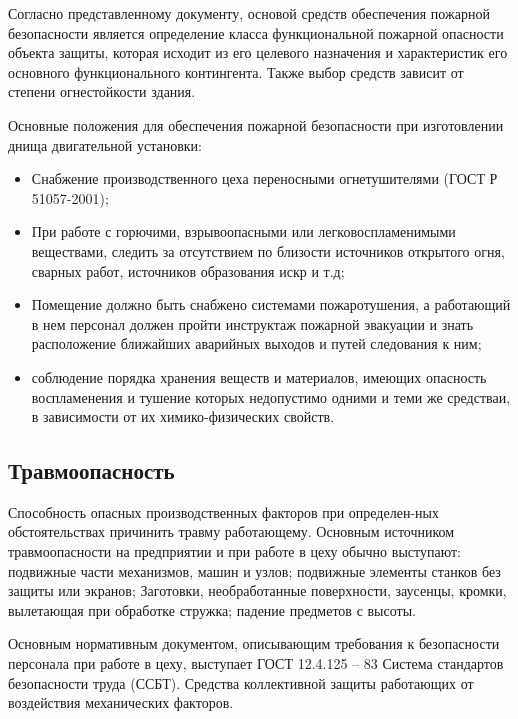 Согласно представленному документу, основой средств обеспечения пожарной безопасности является определение класса функциональной пожарной опасности объекта защиты, которая исходит из его целевого назначения и характеристик его основного функционального контингента. Также выбор средств зависит от степени огнестойкости здания.

Основные положения для обеспечения пожарной безопасности при изготовлении днища двигательной установки:
\begin{itemize}
	\item Снабжение производственного цеха переносными огнетушителями (ГОСТ Р 51057-2001);
	\item При работе с горючими, взрывоопасными или легковоспламенимыми веществами, следить за отсутствием по близости источников открытого огня, сварных работ, источников образования искр и т.д;
	\item Помещение должно быть снабжено системами пожаротушения, а работающий в нем персонал должен пройти инструктаж пожарной эвакуации и знать расположение ближайших аварийных выходов и путей следования к ним;
	\item соблюдение порядка хранения веществ и материалов, имеющих опасность воспламенения и тушение которых недопустимо одними и теми же средстваи, в зависимости от их химико-физических свойств.
\end{itemize}

\clearpage
\subsection{Травмоопасность}
Способность опасных производственных факторов при определен-ных обстоятельствах причинить травму работающему. Основным источником травмоопасности на предприятии и при работе в цеху обычно выступают: подвижные части механизмов, машин и узлов; подвижные элементы станков без защиты или экранов; Заготовки, необработанные поверхности, заусенцы, кромки, вылетающая при обработке стружка; падение предметов с высоты.

Основным нормативным документом, описывающим требования к безопасности персонала при работе в цеху, выступает ГОСТ 12.4.125 – 83 Система стандартов безопасности труда (ССБТ). Средства коллективной защиты работающих от воздействия механических факторов. 

